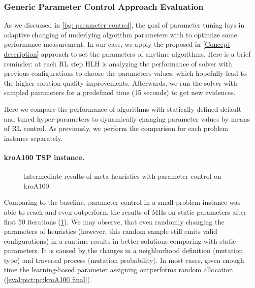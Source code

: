 \subsubsection{Generic Parameter Control Approach Evaluation}
As we discussed in \cref{bg: parameter control}, the goal of parameter tuning lays in adaptive changing of underlying algorithm parameters with to optimize some performance measurement. In our case, we apply the proposed in \cref{Concept description} approach to set the parameters of anytime algorithms. Here is a brief reminder: at each RL step HLH is analyzing the performance of solver with previous configurations to choose the parameters values, which hopefully lead to the higher solution quality improvements. Afterwards, we run the solver with sampled parameters for a predefined time (15 seconds) to get new evidences. 

Here we compare the performance of algorithms with statically defined default and tuned hyper-parameters to dynamically changing parameter values by means of RL control. As previously, we perform the comparison for each problem instance separately.

\newpage
\paragraph{kroA100 TSP instance.}
\begin{figure}[t]
	\centering
	
	\caption{Intermediate results of meta-heuristics with parameter control on kroA100.}
	\label{eval:pict:pc:kroA100 intermediate}
\end{figure}

Comparing to the baseline, parameter control in a small problem instance was able to reach and even outperform the results of MHs on static parameters after first 50 iterations (\cref{eval:pict:pc:kroA100 intermediate}). We may observe, that even randomly changing the parameters of heuristics (however, this random sample still emits valid configurations) in a runtime results in better solutions comparing with static parameters. It is caused by the changes in a neighborhood definition (mutation type) and traversal process (mutation probability). In most cases, given enough time the learning-based parameter assigning outperforms random allocation (\cref{eval:pict:pc:kroA100 final}).

